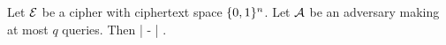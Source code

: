 \begin{lemma} Let ${\cal E}$ be a cipher with ciphertext space $\{0,1\}^n$. 
Let ${\mathcal A}$ be an adversary making at most $q$ queries. Then
\bnm
  \left|  
      -  \right| \le {}  \;.
\enm
\end{lemma}



\begin{figure}


\end{figure}



